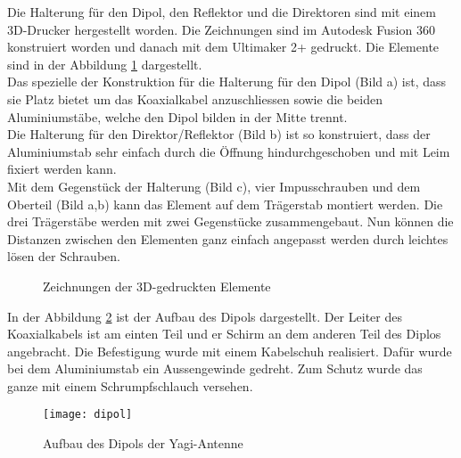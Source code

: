 Die Halterung für den Dipol, den Reflektor und die Direktoren sind mit einem 3D-Drucker hergestellt worden. Die Zeichnungen sind im Autodesk Fusion 360 konstruiert worden und danach mit dem Ultimaker 2+ gedruckt. Die Elemente sind in der Abbildung \ref*{fig:3D-Elemente} dargestellt.\\

Das spezielle der Konstruktion für die Halterung für den Dipol (Bild a) ist, dass sie Platz bietet um das Koaxialkabel anzuschliessen sowie die beiden Aluminiumstäbe, welche den Dipol bilden in der Mitte trennt.\\
Die Halterung für den Direktor/Reflektor (Bild b) ist so konstruiert, dass der Aluminiumstab sehr einfach durch die Öffnung hindurchgeschoben und mit Leim fixiert werden kann. \\
Mit dem Gegenstück der Halterung (Bild c), vier Impusschrauben und dem Oberteil (Bild a,b) kann das Element auf dem Trägerstab montiert werden. Die drei Trägerstäbe werden mit zwei Gegenstücke zusammengebaut. Nun können die Distanzen zwischen den Elementen ganz einfach angepasst werden durch leichtes lösen der Schrauben.

\begin{figure}[H]
	\centering
	\qquad
	\qquad
	\caption{Zeichnungen der 3D-gedruckten Elemente }
	\label{fig:3D-Elemente}
\end{figure}

In der Abbildung \ref*{fig:aufbau_dipol} ist der Aufbau des Dipols dargestellt. Der Leiter des Koaxialkabels ist am einten Teil und er Schirm an dem anderen Teil des Diplos angebracht. Die Befestigung wurde mit einem Kabelschuh realisiert. Dafür wurde bei dem Aluminiumstab ein Aussengewinde gedreht. Zum Schutz wurde das ganze mit einem Schrumpfschlauch versehen.

\begin{figure}[H]
	\centering
	\texttt{[image: dipol]}
	\caption{Aufbau des Dipols der Yagi-Antenne}\label{fig:aufbau_dipol}
\end{figure}
